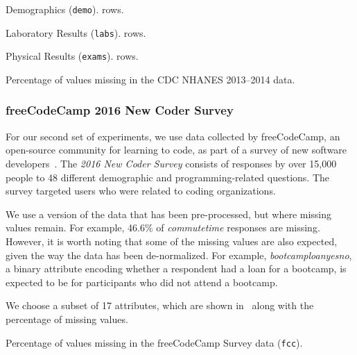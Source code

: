 \begin{table}
  \centering
  \begin{subtable}{0.3\textwidth}
    \centering
    
    \caption{Demographics (\texttt{demo}). \demorows{} rows.}
  \end{subtable}\quad\begin{subtable}{0.3\textwidth}
    \centering
    
    \caption{Laboratory Results (\texttt{labs}). \labexrows{} rows.}
  \end{subtable}\quad\begin{subtable}{0.3\textwidth}
    \centering
    
    \caption{Physical Results (\texttt{exams}). \labexrows{} rows.}
  \end{subtable}
  \caption{Percentage of values missing in the CDC NHANES 2013--2014 data.}\label{table:nhanes-description} 
\end{table}

\subsubsection{freeCodeCamp 2016 New Coder Survey}
For our second set of experiments, we use data collected by freeCodeCamp, an open-source
community for learning to code, as part of a survey of new software
developers~\cite{fcc-data}.  The \textit{2016 New Coder Survey} consists of responses by
over 15,000 people to 48 different demographic and programming-related questions.  The
survey targeted users who were related to coding organizations.

We use a version of the data that has been pre-processed, but where missing values remain.
For example, 46.6\% of \textit{commutetime} responses are missing. However, it is worth
noting that some of the missing values are also expected, given the way the data has been
de-normalized. For example, \textit{bootcamploanyesno}, a binary attribute encoding whether
a respondent had a loan for a bootcamp, is expected to be \nullv{} for participants who did not
attend a bootcamp.

We choose a subset of 17 attributes, which are shown in~ along
with the percentage of missing values.

\begin{table}
  \centering
  
  \caption{Percentage of values missing in the freeCodeCamp Survey data (\texttt{fcc}).}\label{table:fcc-description} 
\end{table}

